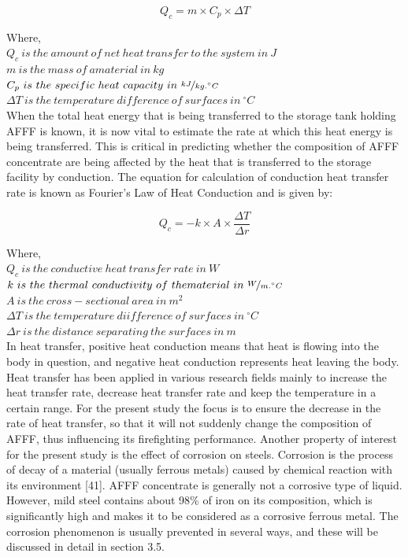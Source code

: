 \documentclass[12pt]{report}
\begin{document}
\begin{equation}
    Q_c = m \times C_p \times \Delta T
\end{equation}

\noindent Where, \\
$Q_c\ is\ the\ amount\ of\ net\ heat\ transfer\ to\ the\ system\ in\ J$ \\
$m\ is\ the\ mass\ of\ amaterial\ in\ kg$ \\
$C_p\ is\ the\ specific\ heat\ capacity\ in\ \nicefrac{kJ}{kg.^\circ C}$ \\
$\Delta T\ is\ the\ temperature\ difference\ of\ surfaces\ in\ ^\circ C$ \\

When the total heat energy that is being transferred to the storage tank holding AFFF is known, it is now vital to estimate the rate at which this heat energy is being transferred. This is critical in predicting whether the composition of AFFF concentrate are being affected by the heat that is transferred to the storage facility by conduction. The equation for calculation of conduction heat transfer rate is known as Fourier’s Law of Heat Conduction and is given by:

\begin{equation}
    Q_c = -k \times A \times \frac{\Delta T}{\Delta r}
\end{equation}

\noindent Where, \\
$Q_c\ is\ the\ conductive\ heat\ transfer\ rate\ in\ W$ \\
$k\ is\ the\ thermal\ conductivity\ of\ thematerial\ in\ \nicefrac{W}{m.^\circ C}$ \\
$A\ is\ the\ cross-sectional\ area\ in\ m^2$ \\
$\Delta T\ is\ the\ temperature\ diifference\ of\ surfaces\ in\ ^\circ C$ \\
$\Delta r\ is\ the\ distance\ separating\ the\ surfaces\ in\ m$ \\

In heat transfer, positive heat conduction means that heat is flowing into the body in question, and negative heat conduction represents heat leaving the body. Heat transfer has been applied in various research fields mainly to increase the heat transfer rate, decrease heat transfer rate and keep the temperature in a certain range. For the present study the focus is to ensure the decrease in the rate of heat transfer, so that it will not suddenly change the composition of AFFF, thus influencing its firefighting performance.  
Another property of interest for the present study is the effect of corrosion on steels. Corrosion is the process of decay of a material (usually ferrous metals) caused by chemical reaction with its environment [41]. AFFF concentrate is generally not a corrosive type of liquid. However, mild steel contains about 98\% of iron on its composition, which is significantly high and makes it to be considered as a corrosive ferrous metal.  The corrosion phenomenon is usually prevented in several ways, and these will be discussed in detail in section 3.5.
\end{document}
